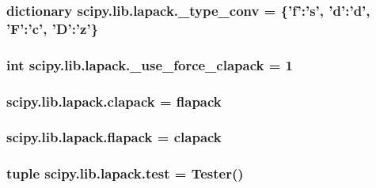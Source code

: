 \subsubsection[{\+\_\+type\+\_\+conv}]{\setlength{\rightskip}{0pt plus 5cm}dictionary scipy.\+lib.\+lapack.\+\_\+type\+\_\+conv = \{'f'\+:'{\bf s}', 'd'\+:'d', 'F'\+:'c', '{\bf D}'\+:'z'\}}\label{namespacescipy_1_1lib_1_1lapack_a4fa2e27e96f0679788bfb6810fe70c8c}
\hypertarget{namespacescipy_1_1lib_1_1lapack_a418c18faa5abfaadbb064e74720fe51c}{}
\subsubsection[{\+\_\+use\+\_\+force\+\_\+clapack}]{\setlength{\rightskip}{0pt plus 5cm}int scipy.\+lib.\+lapack.\+\_\+use\+\_\+force\+\_\+clapack = 1}\label{namespacescipy_1_1lib_1_1lapack_a418c18faa5abfaadbb064e74720fe51c}
\hypertarget{namespacescipy_1_1lib_1_1lapack_abc1995130e6d984420c8f61bd7f92d67}{}
\subsubsection[{clapack}]{\setlength{\rightskip}{0pt plus 5cm}scipy.\+lib.\+lapack.\+clapack = {\bf flapack}}\label{namespacescipy_1_1lib_1_1lapack_abc1995130e6d984420c8f61bd7f92d67}
\hypertarget{namespacescipy_1_1lib_1_1lapack_a404c60aedd17287c494cd682f5a44c5d}{}
\subsubsection[{flapack}]{\setlength{\rightskip}{0pt plus 5cm}scipy.\+lib.\+lapack.\+flapack = {\bf clapack}}\label{namespacescipy_1_1lib_1_1lapack_a404c60aedd17287c494cd682f5a44c5d}
\hypertarget{namespacescipy_1_1lib_1_1lapack_a9d95f4042d7a0ec233c8598344c6a6cf}{}
\subsubsection[{test}]{\setlength{\rightskip}{0pt plus 5cm}tuple scipy.\+lib.\+lapack.\+test = Tester()}\label{namespacescipy_1_1lib_1_1lapack_a9d95f4042d7a0ec233c8598344c6a6cf}

